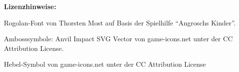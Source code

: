 \vfill
\footnotesize
\textbf{Lizenzhinweise:}

Rogolan-Font von Thorsten Most auf Basis der Spielhilfe \enquote{Angroschs Kinder}.

Ambosssymbole: Anvil Impact SVG Vector von game-icons.net unter der CC Attribution License.

Hebel-Symbol von game-icons.net unter der CC Attribution License
\normalsize